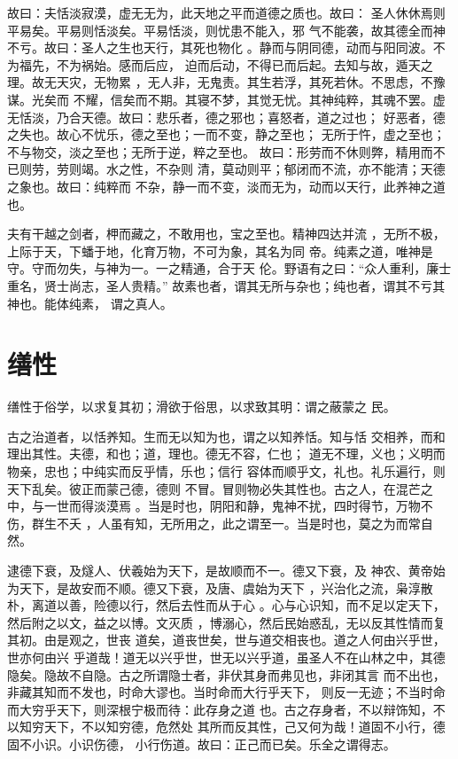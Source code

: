 \documentclass[a4paper,12pt,UTF8,twoside]{ctexbook}
\begin{document}
故曰：夫恬淡寂漠，虚无无为，此天地之平而道德之质也。故曰： 圣人休休焉则平易矣。平易则恬淡矣。平易恬淡，则忧患不能入，邪 气不能袭，故其德全而神不亏。故曰：圣人之生也天行，其死也物化 。静而与阴同德，动而与阳同波。不为福先，不为祸始。感而后应， 迫而后动，不得已而后起。去知与故，遁天之理。故无天灾，无物累 ，无人非，无鬼责。其生若浮，其死若休。不思虑，不豫谋。光矣而 不耀，信矣而不期。其寝不梦，其觉无忧。其神纯粹，其魂不罢。虚 无恬淡，乃合天德。故曰：悲乐者，德之邪也；喜怒者，道之过也； 好恶者，德之失也。故心不忧乐，德之至也；一而不变，静之至也； 无所于忤，虚之至也；不与物交，淡之至也；无所于逆，粹之至也。 故曰：形劳而不休则弊，精用而不已则劳，劳则竭。水之性，不杂则 清，莫动则平；郁闭而不流，亦不能清；天德之象也。故曰：纯粹而 不杂，静一而不变，淡而无为，动而以天行，此养神之道也。

夫有干越之剑者，柙而藏之，不敢用也，宝之至也。精神四达并流 ，无所不极，上际于天，下蟠于地，化育万物，不可为象，其名为同 帝。纯素之道，唯神是守。守而勿失，与神为一。一之精通，合于天 伦。野语有之曰：“众人重利，廉士重名，贤士尚志，圣人贵精。” 故素也者，谓其无所与杂也；纯也者，谓其不亏其神也。能体纯素， 谓之真人。
\section{缮性}

缮性于俗学，以求复其初；滑欲于俗思，以求致其明：谓之蔽蒙之 民。

古之治道者，以恬养知。生而无以知为也，谓之以知养恬。知与恬 交相养，而和理出其性。夫德，和也；道，理也。德无不容，仁也； 道无不理，义也；义明而物亲，忠也；中纯实而反乎情，乐也；信行 容体而顺乎文，礼也。礼乐遍行，则天下乱矣。彼正而蒙己德，德则 不冒。冒则物必失其性也。古之人，在混芒之中，与一世而得淡漠焉 。当是时也，阴阳和静，鬼神不扰，四时得节，万物不伤，群生不夭 ，人虽有知，无所用之，此之谓至一。当是时也，莫之为而常自然。

逮德下衰，及燧人、伏羲始为天下，是故顺而不一。德又下衰，及 神农、黄帝始为天下，是故安而不顺。德又下衰，及唐、虞始为天下 ，兴治化之流，枭淳散朴，离道以善，险德以行，然后去性而从于心 。心与心识知，而不足以定天下，然后附之以文，益之以博。文灭质 ，博溺心，然后民始惑乱，无以反其性情而复其初。由是观之，世丧 道矣，道丧世矣，世与道交相丧也。道之人何由兴乎世，世亦何由兴 乎道哉！道无以兴乎世，世无以兴乎道，虽圣人不在山林之中，其德 隐矣。隐故不自隐。古之所谓隐士者，非伏其身而弗见也，非闭其言 而不出也，非藏其知而不发也，时命大谬也。当时命而大行乎天下， 则反一无迹；不当时命而大穷乎天下，则深根宁极而待：此存身之道 也。古之存身者，不以辩饰知，不以知穷天下，不以知穷德，危然处 其所而反其性，己又何为哉！道固不小行，德固不小识。小识伤德， 小行伤道。故曰：正己而已矣。乐全之谓得志。
\end{document}
